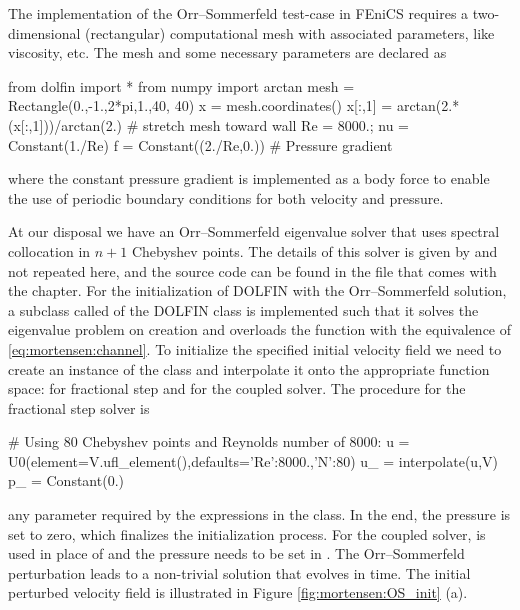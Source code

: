 The implementation of the Orr--Sommerfeld test-case in FEniCS requires
a two-dimensional (rectangular) computational mesh with associated
parameters, like viscosity, etc. The mesh and some necessary
parameters are declared as
\begin{python}
from dolfin import *
from numpy import arctan
mesh = Rectangle(0.,-1.,2*pi,1.,40, 40)
x = mesh.coordinates()
x[:,1] = arctan(2.*(x[:,1]))/arctan(2.)  # stretch mesh toward wall
Re = 8000.; nu = Constant(1./Re)
f = Constant((2./Re,0.)) # Pressure gradient
\end{python}
where the constant pressure gradient is implemented as a body force to enable the use of periodic boundary conditions for both velocity and pressure.

At our disposal we have an Orr--Sommerfeld eigenvalue solver that uses
spectral collocation in $n+1$ Chebyshev points. The details of this
solver is given by \citet{Trefethen2006} and not repeated here, and
the source code can be found in the file 
that comes with the chapter. For the initialization of DOLFIN
 with the Orr--Sommerfeld solution, a subclass called
 of the DOLFIN class  is implemented such that
it solves the eigenvalue problem on creation and overloads the
 function with the equivalence of
\eqref{eq:mortensen:channel}. To initialize the specified initial
velocity field we need to create an instance of the  class and
interpolate it onto the appropriate function space:  for
fractional step and  for the coupled solver. The procedure for
the fractional step solver is
\begin{python}
# Using 80 Chebyshev points and Reynolds number of 8000:
u = U0(element=V.ufl_element(),defaults={'Re':8000.,'N':80})
u_ = interpolate(u,V)
p_ = Constant(0.)
\end{python}
any parameter required by the expressions in the  class. In
the end, the pressure is set to zero, which finalizes the
initialization process. For the coupled solver,  is used in
place of  and the pressure needs to be set in . The
Orr--Sommerfeld perturbation leads to a non-trivial solution that
evolves in time. The initial perturbed velocity field is illustrated
in Figure \ref{fig:mortensen:OS_init} (a).
